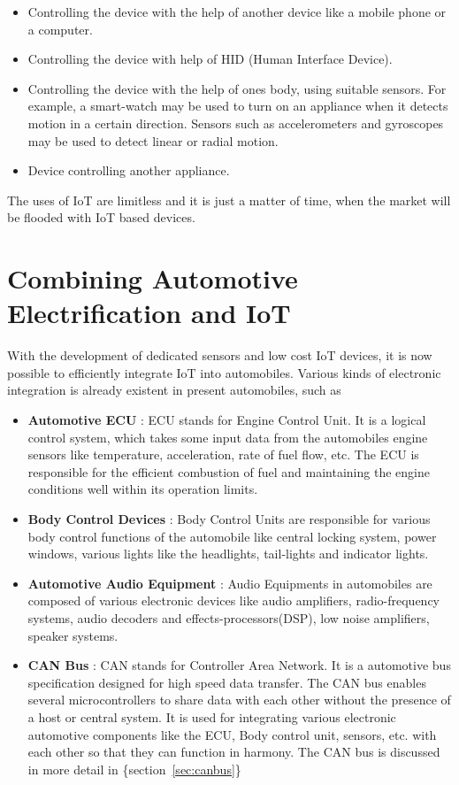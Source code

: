 \documentclass[]{book}
\providecommand{\tightlist}{%
  \setlength{\itemsep}{0pt}\setlength{\parskip}{0pt}}
\begin{document}
\begin{itemize}
\tightlist
\item
  Controlling the device with the help of another device like a mobile
  phone or a computer.
\item
  Controlling the device with help of HID (Human Interface Device).
\item
  Controlling the device with the help of ones body, using suitable
  sensors. For example, a smart-watch may be used to turn on an
  appliance when it detects motion in a certain direction. Sensors such
  as accelerometers and gyroscopes may be used to detect linear or
  radial motion.
\item
  Device controlling another appliance.
\end{itemize}

The uses of IoT are limitless and it is just a matter of time, when the
market will be flooded with IoT based devices.

\section{Combining Automotive Electrification and
IoT}\label{combining-automotive-electrification-and-iot}

With the development of dedicated sensors and low cost IoT devices, it
is now possible to efficiently integrate IoT into automobiles. Various
kinds of electronic integration is already existent in present
automobiles, such as

\begin{itemize}
\tightlist
\item
  \textbf{Automotive ECU} : ECU stands for Engine Control Unit. It is a
  logical control system, which takes some input data from the
  automobiles engine sensors like temperature, acceleration, rate of
  fuel flow, etc. The ECU is responsible for the efficient combustion of
  fuel and maintaining the engine conditions well within its operation
  limits.
\item
  \textbf{Body Control Devices} : Body Control Units are responsible for
  various body control functions of the automobile like central locking
  system, power windows, various lights like the headlights, tail-lights
  and indicator lights.
\item
  \textbf{Automotive Audio Equipment} : Audio Equipments in automobiles
  are composed of various electronic devices like audio amplifiers,
  radio-frequency systems, audio decoders and effects-processors(DSP),
  low noise amplifiers, speaker systems.
\item
  \textbf{CAN Bus} : CAN stands for Controller Area Network. It is a
  automotive bus specification designed for high speed data transfer.
  The CAN bus enables several microcontrollers to share data with each
  other without the presence of a host or central system. It is used for
  integrating various electronic automotive components like the ECU,
  Body control unit, sensors, etc. with each other so that they can
  function in harmony. The CAN bus is discussed in more detail in
  \{section~\ref{sec:canbus}\}
\end{itemize}
\end{document}
